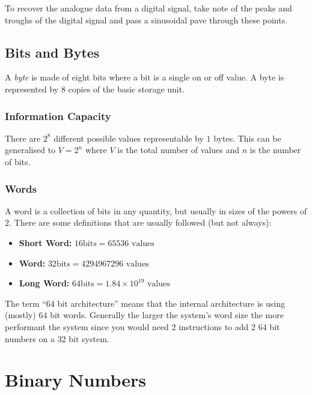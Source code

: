\begin{note}
	To recover the analogue data from a digital signal, take note of the peaks and troughs of the digital signal and pass a sinusoidal pave through these points.
\end{note}

\subsection{Bits and Bytes}\label{sub:bits_and_bytes}

A \emph{byte} is made of eight bits where a bit is a single on or off value.
A byte is represented by \(8\) copies of the basic storage unit.

\subsubsection{Information Capacity}\label{ssub:information_capacity}

There are \(2^8\) different possible values representable by \(1\) bytes.
This can be generalised to \(V=2^{n}\) where \(V\) is the total number of values and \(n\) is the number of bits.

\subsubsection{Words}\label{ssub:words}

A word is a collection of bits in any quantity, but usually in sizes of the powers of \(2\).
There are some definitions that are usually followed (but not always):

\begin{itemize}
	\item \textbf{Short Word:} \(16 \textrm{bits} = 65536 \textrm{ values}\)
	\item \textbf{Word:} \(32 \textrm{bits} = 4294967296 \textrm{ values}\)
	\item \textbf{Long Word:} \(64 \textrm{bits} = 1.84 \times 10^{19} \textrm{ values}\)
\end{itemize}

The term ``\(64\) bit architecture'' means that the internal architecture is using (mostly) \(64\) bit words.
Generally the larger the system's word size the more performant the system since you would need \(2\) instructions to add \(2\) \(64\) bit numbers on a \(32\) bit system.

\section{Binary Numbers}\label{sec:binary_numbers}

